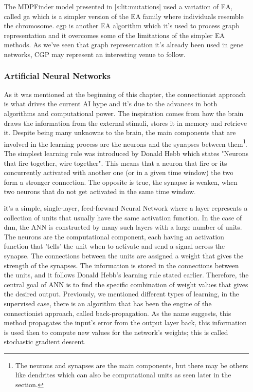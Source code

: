 The MDPFinder model presented in \cref{s:lit:mutations} used a variation of EA, called \acrfull{ga} which is a simpler version of the EA family where individuals resemble the chromosome. \acrfull{cgp} is another EA algorithm which it's used to process graph representation and it overcomes some of the limitations of the simpler EA methods. As we've seen that graph representation it's already been used in gene networks, CGP may represent an interesting venue to follow. 



\subsubsection{Artificial Neural Networks} \label{s:lit:ann_overview}

As it was mentioned at the beginning of this chapter, the connectionist approach is what drives the current AI hype and it's due to the advances in both algorithms and computational power. The inspiration comes from how the brain draws the information from the external stimuli, stores it in memory and retrieve it. Despite being many unknowns to the brain, the main components that are involved in the learning process are the neurons and the synapses between them\footnote{The neurons and synapses are the main components, but there may be others like dendrites which can also be computational units as seen later in the section.}. The simplest learning rule was introduced by Donald Hebb which states "Neurons that fire together, wire together"\cite{Hebb_Donald1949-nn}. This means that a neuron that fire or its concurrently activated with another one (or in a given time window) the two form a stronger connection. The opposite is true, the synapse is weaken, when two neurons that do not get activated in the same time window.

 it's a simple, single-layer, feed-forward Neural Network where a layer represents a collection of units that usually have the same activation function. In the case of \acrfull{dnn}, the ANN is constructed by many such layers with a large number of units. The neurons are the computational component, each having an activation function that 'tells' the unit when to activate and send a signal across the synapse. The connections between the units are assigned a weight that gives the strength of the synapses. The information is stored in the connections between the units, and it follows Donald Hebb's learning rule stated earlier. Therefore, the central goal of ANN is to find the specific combination of weight values that gives the desired output. Previously, we mentioned different types of learning, in the supervised case, there is an algorithm that has been the engine of the connectionist approach, called back-propagation. As the name suggests, this method propagates the input's error from the output layer back, this information is used then to compute new values for the network's weights; this is called stochastic gradient descent.

